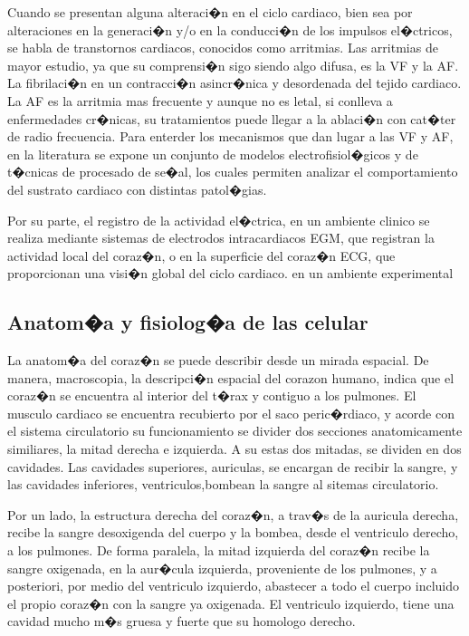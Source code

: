 Cuando se presentan alguna alteraci�n en el ciclo cardiaco, bien sea por
alteraciones en la generaci�n y/o en la conducci�n de los impulsos el�ctricos,
se habla de transtornos cardiacos, conocidos como arritmias. Las arritmias de
mayor estudio, ya que su comprensi�n sigo siendo algo difusa, es la \acf{VF} y
la \acf{AF}. La fibrilaci�n en un contracci�n asincr�nica y desordenada del
tejido cardiaco. La \ac{AF} es la arritmia mas frecuente y aunque no es letal,
si conlleva a enfermedades cr�nicas, su tratamientos puede llegar a la ablaci�n
con cat�ter de radio frecuencia.  Para enterder los mecanismos que dan lugar
a las \ac{VF} y \ac{AF}, en la literatura se expone un conjunto de modelos
electrofisiol�gicos y de t�cnicas de procesado de se�al, los cuales permiten
analizar el comportamiento del sustrato cardiaco con distintas patol�gias. 


Por su parte, el registro de la actividad el�ctrica, en un ambiente clinico se
realiza mediante sistemas de electrodos intracardiacos \ac{EGM}, que registran
la actividad local del coraz�n, o en la superficie del coraz�n \ac{ECG}, que
proporcionan una visi�n global del ciclo cardiaco. en un ambiente experimental




\subsection{Anatom�a y fisiolog�a de las celular}

La anatom�a del coraz�n se puede describir desde un  mirada espacial. De manera,
macroscopia, la descripci�n espacial del corazon humano, indica que el coraz�n 
se encuentra al interior del t�rax y contiguo a los pulmones. El musculo
cardiaco se encuentra recubierto por el saco peric�rdiaco, y acorde con el
sistema circulatorio su funcionamiento se divider dos secciones anatomicamente similiares, la mitad
derecha e izquierda. A su estas dos mitadas, se dividen en dos cavidades. Las
cavidades superiores, auriculas, se encargan de recibir la sangre, y las
cavidades  inferiores, ventriculos,bombean la sangre al sitemas circulatorio.

Por un lado, la estructura derecha del coraz�n, a trav�s de la auricula derecha,
recibe la sangre desoxigenda del cuerpo  y la bombea, desde el ventriculo
derecho, a los pulmones. De forma paralela, la mitad izquierda del coraz�n
recibe la sangre oxigenada, en la aur�cula izquierda, proveniente de los
pulmones, y a posteriori, por medio del ventriculo izquierdo, abastecer a todo
el cuerpo incluido el propio coraz�n con la sangre ya oxigenada.
El ventriculo izquierdo, tiene una cavidad mucho
m�s gruesa y fuerte que su homologo derecho. 

